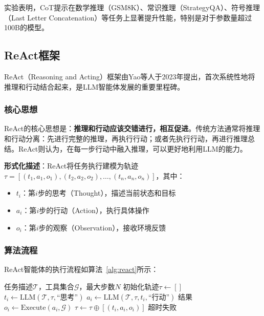 实验表明，CoT提示在数学推理（GSM8K）、常识推理（StrategyQA）、符号推理（Last Letter Concatenation）等任务上显著提升性能，特别是对于参数量超过100B的模型。

\subsection{ReAct框架}

ReAct（Reasoning and Acting）框架由Yao等人\cite{yao2023react}于2023年提出，首次系统性地将推理和行动结合起来，是LLM智能体发展的重要里程碑。

\subsubsection{核心思想}

ReAct的核心思想是：\textbf{推理和行动应该交错进行，相互促进}。传统方法通常将推理和行动分离：先进行完整的推理，再执行行动；或者先执行行动，再进行推理总结。ReAct则认为，在每一步行动中融入推理，可以更好地利用LLM的能力。

\textbf{形式化描述}：ReAct将任务执行建模为轨迹$\tau = [(t_1, a_1, o_1), (t_2, a_2, o_2), \ldots, (t_n, a_n, o_n)]$，其中：

\begin{itemize}[leftmargin=2em]
    \item $t_i$：第$i$步的思考（Thought），描述当前状态和目标
    \item $a_i$：第$i$步的行动（Action），执行具体操作
    \item $o_i$：第$i$步的观察（Observation），接收环境反馈
\end{itemize}

\subsubsection{算法流程}

ReAct智能体的执行流程如算法~\ref{alg:react}所示：

\begin{algorithm}[htbp]
    \caption{ReAct执行流程}\label{alg:react}
    \begin{algorithmic}[1]
        \Require 任务描述$\mathcal{T}$，工具集合$\mathcal{G}$，最大步数$N$
        \State 初始化轨迹$\tau \leftarrow []$
            \State $t_i \leftarrow \text{LLM}(\mathcal{T}, \tau, \text{``思考''})$ 
            \State $a_i \leftarrow \text{LLM}(\mathcal{T}, \tau, t_i, \text{``行动''})$ 
                \State \Return 结果
            \EndIf
            \State $o_i \leftarrow \text{Execute}(a_i, \mathcal{G})$ 
            \State $\tau \leftarrow \tau \oplus [(t_i, a_i, o_i)]$ 
        \EndFor
        \State \Return 超时失败
    \end{algorithmic}
\end{algorithm}

